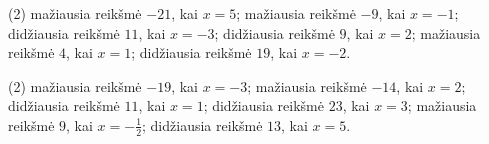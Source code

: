 \documentclass[11pt,a4paper]{scrartcl}
\begin{document}
\newpage
\answerssection

\begin{problem} \phantom{text}
\begin{tasks}[label={(\arabic*)}, label-offset=0.9em](2)
	\task mažiausia reikšmė $-21$, kai $x=5$;
	\task mažiausia reikšmė $-9$, kai $x=-1$;
	\task didžiausia reikšmė $11$, kai $x=-3$;
	\task didžiausia reikšmė $9$, kai $x=2$;
	\task mažiausia reikšmė $4$, kai $x=1$;
	\task didžiausia reikšmė $19$, kai $x=-2$.
\end{tasks}
\end{problem}

\begin{problem} \phantom{text}
\begin{tasks}[label={(\arabic*)}, label-offset=0.9em](2)
	\task mažiausia reikšmė $-19$, kai $x=-3$;
	\task mažiausia reikšmė $-14$, kai $x=2$;
	\task didžiausia reikšmė $11$, kai $x=1$;
	\task didžiausia reikšmė $23$, kai $x=3$;
	\task mažiausia reikšmė $9$, kai $x=-\frac{1}{2}$;
	\task didžiausia reikšmė $13$, kai $x=5$.
\end{tasks}
\end{problem}
\end{document}
